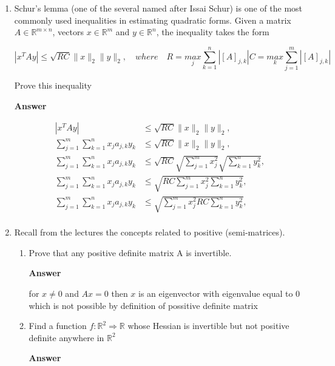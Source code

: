 \documentclass[11pt]{article}
\begin{document}
\begin{enumerate}[label=(\alph*)]

\item Schur's lemma (one of the several named after Issai Schur) is one of the most commonly used inequalities in estimating quadratic forms. Given a matrix $A \in \mathbb{R}^{m \times n}$, vectors $x \in \mathbb{R}^m$ and $y \in \mathbb{R}^n$, the inequality takes the form

\begin{equation}
|x^TAy|\leq \sqrt{RC}\|x\|_2\|y\|_2, \quad where \quad  R = \underset{j}{max}\sum_{k=1}^{n} |[A]_{j,k}| C=\underset{k}{max}\sum_{j=1}^{m}|[A]_{j,k}|
\end{equation}

Prove this inequality

\noindent\textbf{Answer}

\begin{align*}
|x^TAy| & \leq \sqrt{RC}\|x\|_2\|y\|_2, \\
\sum_{j=1}^m \sum_{k=1}^n x_j a_{j,k} y_k &\leq \sqrt{RC}\|x\|_2\|y\|_2, \\
\sum_{j=1}^m \sum_{k=1}^n x_j a_{j,k} y_k &\leq \sqrt{RC}\sqrt{\sum_{j=1}^m x_j^2}\sqrt{\sum_{k=1}^n y_k^2}, \\
\sum_{j=1}^m \sum_{k=1}^n x_j a_{j,k} y_k &\leq \sqrt{RC\sum_{j=1}^m x_j^2 \sum_{k=1}^n y_k^2}, \\
\sum_{j=1}^m \sum_{k=1}^n x_j a_{j,k} y_k &\leq \sqrt{\sum_{j=1}^m x_j^2 RC \sum_{k=1}^n y_k^2}, \\
\end{align*}

\item Recall from the lectures the concepts related to positive (semi-matrices).

\begin{enumerate}[label=(\roman*)]

\item Prove that any positive definite matrix A is invertible.

\noindent\textbf{Answer}

for $x \ne 0$ and $Ax = 0$ then $x$ is an eigenvector with eigenvalue equal to 0 which is not possible by definition of possitive definite matrix

\item Find a function $f: \mathbb{R}^2 \Rightarrow \mathbb{R}$ whose Hessian is invertible but not positive definite anywhere in $\mathbb{R}^2$

\noindent\textbf{Answer}


\end{enumerate}
\end{enumerate}
\end{document}

